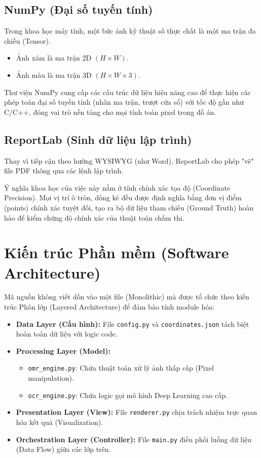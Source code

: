 \documentclass[6pt, a4paper]{report}
\begin{document}
	\subsection{NumPy (Đại số tuyến tính)}
	Trong khoa học máy tính, một bức ảnh kỹ thuật số thực chất là một ma trận đa chiều (Tensor). 
	\begin{itemize}
		\item Ảnh xám là ma trận 2D $(H \times W)$.
		\item Ảnh màu là ma trận 3D $(H \times W \times 3)$.
	\end{itemize}
	Thư viện NumPy cung cấp các cấu trúc dữ liệu hiệu năng cao để thực hiện các phép toán đại số tuyến tính (nhân ma trận, trượt cửa sổ) với tốc độ gần như C/C++, đóng vai trò nền tảng cho mọi tính toán pixel trong đồ án.
	
	\subsection{ReportLab (Sinh dữ liệu lập trình)}
	Thay vì tiếp cận theo hướng WYSIWYG (như Word), ReportLab cho phép "vẽ" file PDF thông qua các lệnh lập trình. 
	
	Ý nghĩa khoa học của việc này nằm ở tính chính xác tọa độ (Coordinate Precision). Mọi vị trí ô tròn, dòng kẻ đều được định nghĩa bằng đơn vị điểm (points) chính xác tuyệt đối, tạo ra bộ dữ liệu tham chiếu (Ground Truth) hoàn hảo để kiểm chứng độ chính xác của thuật toán chấm thi.
	
	\section{Kiến trúc Phần mềm (Software Architecture)}
	Mã nguồn không viết dồn vào một file (Monolithic) mà được tổ chức theo kiến trúc Phân lớp (Layered Architecture) để đảm bảo tính module hóa:
	
	\begin{itemize}
		\item \textbf{Data Layer (Cấu hình):} File \texttt{config.py} và \texttt{coordinates.json} tách biệt hoàn toàn dữ liệu với logic code.
		\item \textbf{Processing Layer (Model):} 
		\begin{itemize}
			\item \texttt{omr\_engine.py}: Chứa thuật toán xử lý ảnh thấp cấp (Pixel manipulation).
			\item \texttt{ocr\_engine.py}: Chứa logic gọi mô hình Deep Learning cao cấp.
		\end{itemize}
		\item \textbf{Presentation Layer (View):} File \texttt{renderer.py} chịu trách nhiệm trực quan hóa kết quả (Visualization).
		\item \textbf{Orchestration Layer (Controller):} File \texttt{main.py} điều phối luồng dữ liệu (Data Flow) giữa các lớp trên.
	\end{itemize}
	
\end{document}

